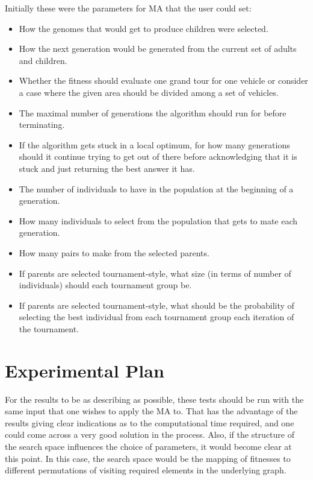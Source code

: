 Initially these were the parameters for MA that the user could set:
\begin{itemize}
    \item How the genomes that would get to produce children were selected.
    \item How the next generation would be generated from the current set of adults and children.
    \item Whether the fitness should evaluate one grand tour for one vehicle or consider a case where the given area should be divided among a set of vehicles.
    \item The maximal number of generations the algorithm should run for before terminating.
    \item If the algorithm gets stuck in a local optimum, for how many generations should it continue trying to get out of there before acknowledging that it is stuck and just returning the best answer it has.
    \item The number of individuals to have in the population at the beginning of a generation.
    \item How many individuals to select from the population that gets to mate each generation.
    \item How many pairs to make from the selected parents.
    \item If parents are selected tournament-style, what size (in terms of number of individuals) should each tournament group be.
    \item If parents are selected tournament-style, what should be the probability of selecting the best individual from each tournament group each iteration of the tournament.

\end{itemize}

\section{Experimental Plan} %
\label{sec:experimental_plan}
For the results to be as describing as possible, these tests should be run with the same input that one wishes to apply the MA to. That has the advantage of the results giving clear indications as to the computational time required, and one could come across a very good solution in the process. Also, if the structure of the search space influences the choice of parameters, it would become clear at this point. In this case, the search space would be the mapping of fitnesses to different permutations of visiting required elements in the underlying graph.

